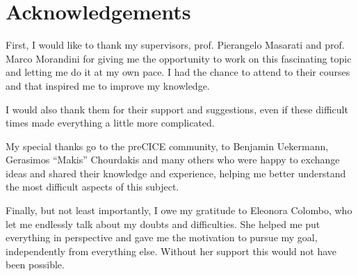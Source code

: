 \chapter*{Acknowledgements}
\label{cha:acknowledgements}

First, I would like to thank my supervisors, prof. Pierangelo Masarati and prof. Marco Morandini for giving me the opportunity to work on this fascinating topic and  letting me do it at my own pace. I had the chance to attend  to their courses and  that inspired me to improve my knowledge.

I would also thank them for their support and suggestions, even if these difficult times made everything a little more complicated. 

My special thanks go to the preCICE community, to Benjamin Uekermann, Gerasimos ``Makis'' Chourdakis and many others who were happy to exchange ideas and shared their knowledge and experience, helping me better understand the most difficult aspects of this subject.

Finally, but not least importantly, I owe my gratitude to Eleonora Colombo, who let me endlessly talk about my doubts and difficulties. She helped me put everything in perspective and gave me the motivation to pursue my goal, independently from everything else. Without her support this would not have been possible. 



